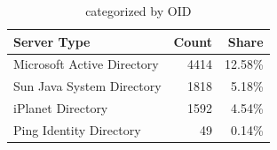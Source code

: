 \begin{table}[htbp]
\centering
\begin{tabular}{l r r}
\toprule
\textbf{Server Type} & \textbf{Count} & \textbf{Share}  \\
\midrule
\midrule
Microsoft Active Directory & 4414 & 12.58\% \\
Sun Java System Directory & 1818 & 5.18\% \\
iPlanet Directory & 1592 & 4.54\% \\
Ping Identity Directory & 49 & 0.14\% \\
\bottomrule
\end{tabular}
\caption{categorized by OID}
\label{tab:CatByOID}
\end{table}